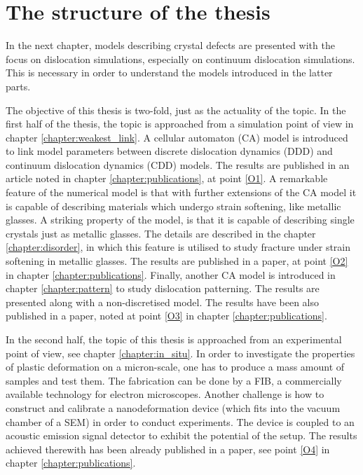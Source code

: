 \section{The structure of the thesis}
In the next chapter, models describing crystal defects are presented with the focus on dislocation simulations, especially on continuum dislocation simulations. This is necessary in order to understand the models introduced in the latter parts.

The objective of this thesis is two-fold, just as the actuality of the topic. 
In the first half of the thesis, the topic is approached from a simulation point of view in chapter \ref{chapter:weakest_link}. A cellular automaton (CA) model is introduced to link model parameters between discrete dislocation dynamics (DDD) and continuum dislocation dynamics (CDD)  models. The results are published in an article noted in chapter \ref{chapter:publications}, at point \hyperref[paper:A2]{[O1]}. A remarkable feature of the numerical model is that with further extensions of the CA model it is capable of describing materials which undergo strain softening, like metallic glasses. A striking property of the model, is that it is capable of describing single crystals just as metallic glasses. The details are described in the chapter \ref{chapter:disorder}, in which this feature is utilised to study fracture under strain softening in metallic glasses. The results are published in a paper, at point \hyperref[paper:A3]{[O2]} in chapter \ref{chapter:publications}. Finally, another CA model is introduced in chapter \ref{chapter:pattern} to study dislocation patterning. The results are presented along with a non-discretised model. The results have been also published in a paper, noted at point \hyperref[paper:A4]{[O3]} in chapter \ref{chapter:publications}.

In the second half, the topic of this thesis is approached from an experimental point of view, see chapter \ref{chapter:in_situ}. In order to investigate the properties of plastic deformation on a micron-scale, one has to produce a mass amount of samples and test them. The fabrication can be done by a FIB, a commercially available technology for electron microscopes. Another challenge is how to construct and calibrate a nanodeformation device (which fits into the vacuum chamber of a SEM) in order to conduct experiments. The device is coupled to an acoustic emission signal detector to exhibit the potential of the setup. The results achieved therewith has been already published in a paper, see point \hyperref[paper:A1]{[O4]} in chapter \ref{chapter:publications}.